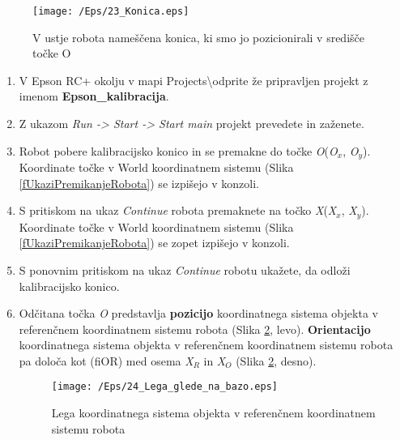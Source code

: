 \begin{figure}[!h]
    \center
    \texttt{[image: /Eps/23\_Konica.eps]}
    \vspace{-0.3cm}
    \caption{V ustje robota nameščena konica, ki smo jo pozicionirali v središče točke O}
    \label{fKonica}
\end{figure}
\begin{enumerate}

\item[1)] V Epson RC+ okolju v mapi Projects\textbackslash odprite že pripravljen projekt z imenom \textbf{Epson\_kalibracija}.

\item[2)] Z ukazom \textit{Run -> Start -> Start main} projekt prevedete in zaženete.

\item[3)] Robot pobere kalibracijsko konico in se premakne do točke \emph{O}(\emph{O}$_x$, \emph{O}$_y$). Koordinate točke v World koordinatnem sistemu (Slika \ref{fUkaziPremikanjeRobota}) se izpišejo v konzoli.

\item[4)] S pritiskom na ukaz \textit{Continue} robota premaknete na točko \emph{X}(\emph{X}$_x$, \emph{X}$_y$). Koordinate točke v World koordinatnem sistemu (Slika \ref{fUkaziPremikanjeRobota}) se zopet izpišejo v konzoli.

\item[5)] S ponovnim pritiskom na ukaz \textit{Continue} robotu ukažete, da odloži kalibracijsko konico.

\item[6)] Odčitana točka \emph{O} predstavlja \textbf{pozicijo}
koordinatnega sistema objekta v referenčnem koordinatnem sistemu
robota (Slika \ref{fTransfOR}, levo). \textbf{Orientacijo}
koordinatnega sistema objekta v referenčnem koordinatnem sistemu
robota pa določa kot (fiOR) med osema \emph{X}$_R$ in \emph{X}$_O$
(Slika \ref{fTransfOR}, desno).

\begin{figure}[h]
    \center
    \texttt{[image: /Eps/24\_Lega\_glede\_na\_bazo.eps]}
    \vspace{-0.3cm}
    \caption{Lega koordinatnega sistema objekta v referenčnem koordinatnem sistemu robota}
    \label{fTransfOR}
\end{figure}


\end{enumerate}
